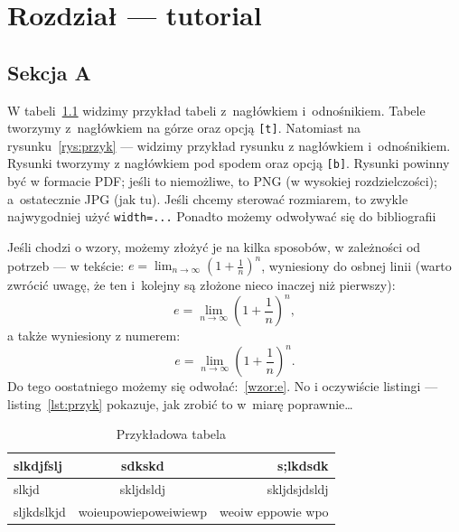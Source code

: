 
\chapter{Rozdział — tutorial}

\section{Sekcja A}

W tabeli~\ref{tab:przyk} widzimy przykład tabeli z~nagłówkiem i~odnośnikiem. Tabele tworzymy z~nagłówkiem na górze oraz opcją \texttt{[t]}.
Natomiast na rysunku~\ref{rys:przyk} --- widzimy przykład rysunku z nagłówkiem i~odnośnikiem.
Rysunki tworzymy z nagłówkiem pod spodem oraz opcją \texttt{[b]}.
Rysunki powinny być w formacie PDF; jeśli to niemożliwe, to PNG (w wysokiej rozdzielczości); a~ostatecznie JPG (jak tu). Jeśli chcemy sterować rozmiarem, to zwykle najwygodniej użyć \texttt{width=...}
Ponadto możemy odwoływać się do bibliografii

Jeśli chodzi o wzory, możemy złożyć je na kilka sposobów, w zależności od potrzeb --- w tekście: $e=\lim_{n\to\infty}\left(1+\frac{1}{n}\right)^n$, wyniesiony do osbnej linii
(warto zwrócić uwagę, że ten i~kolejny są złożone nieco inaczej niż pierwszy):
\[e=\lim_{n\to\infty}\left(1+\frac{1}{n}\right)^n,\] a także wyniesiony z numerem:
\begin{equation}
    e=\lim_{n\to\infty}\left(1+\frac{1}{n}\right)^n.
    \label{wzor:e}
\end{equation}
Do tego oostatniego możemy się odwołać:~\eqref{wzor:e}.
No i oczywiście listingi --- listing~\ref{lst:przyk} pokazuje, jak zrobić to w~miarę poprawnie\ldots{}

\begin{table}[t]
    \begin{center}
        \caption{Przykładowa tabela}\label{tab:przyk}
        \begin{tabular}{l|c|r}
            slkdjfslj  & sdkskd               & s;lkdsdk          \\
            \hline
            slkjd      & skljdsldj            & skljdsjdsldj      \\
            sljkdslkjd & woieupowiepoweiwiewp & weoiw eppowie wpo \\
        \end{tabular}
    \end{center}
\end{table}

